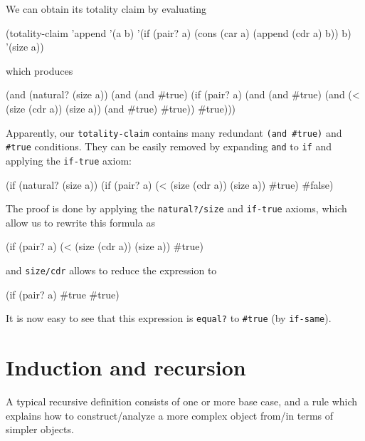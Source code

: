 We can obtain its totality claim by evaluating

\begin{Snippet}
  (totality-claim 'append '(a b)
    '(if (pair? a)
        (cons (car a) (append (cdr a) b))
        b)
    '(size a))
\end{Snippet}

which produces

\begin{Snippet}
  (and (natural? (size a))
       (and (and #true)
            (if (pair? a)
                (and (and #true)
                     (and (< (size (cdr a)) (size a))
                          (and #true)
                          #true))
                #true)))
\end{Snippet}

Apparently, our \texttt{totality-claim} contains many redundant
\texttt{(and \#true)} and \texttt{\#true} conditions. They can be easily
removed by expanding \texttt{and} to \texttt{if} and applying the
\texttt{if-true} axiom:

\begin{Snippet}
  (if (natural? (size a))
      (if (pair? a)
          (< (size (cdr a)) (size a))
          #true)
      #false)
\end{Snippet}

The proof is done by applying the \texttt{natural?/size} and \texttt{if-true}
axioms, which allow us to rewrite this formula as

\begin{Snippet}
  (if (pair? a)
      (< (size (cdr a)) (size a))
      #true)
\end{Snippet}

and \texttt{size/cdr} allows to reduce the expression to

\begin{Snippet}
  (if (pair? a)
      #true
      #true)
\end{Snippet}

It is now easy to see that this expression is \texttt{equal?}\,\,to
\texttt{\#true} (by \texttt{if-same}).

\section{Induction and recursion}

A typical recursive definition consists of one or more base case,
and a rule which explains how to construct/analyze a more
complex object from/in terms of simpler objects.


